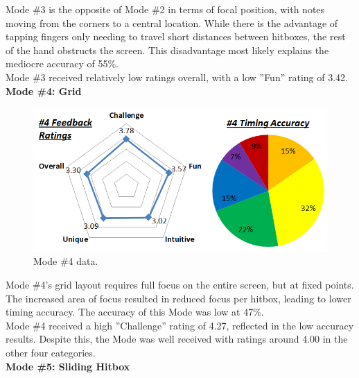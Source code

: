 \documentclass{sig-alternate}
\begin{document}
Mode \#3 is the opposite of Mode \#2 in terms of focal position, with notes moving from the corners to a central location. While there is the advantage of tapping fingers only needing to travel short distances between hitboxes, the rest of the hand obstructs the screen. This disadvantage most likely explains the mediocre accuracy of 55\%. \\

Mode \#3 received relatively low ratings overall, with a low ''Fun'' rating of 3.42. \\

\noindent \textbf{Mode \#4: Grid}

\begin{figure}[htb!]
	\begin{center}
		\includegraphics[width=1\linewidth]{figure_chart_4}
	\end{center}
	\vspace{-12pt}
	\caption{Mode \#4 data.}
	\label{fig:chart_4}
\end{figure}

Mode \#4's grid layout requires full focus on the entire screen, but at fixed points. The increased area of focus resulted in reduced focus per hitbox, leading to lower timing accuracy. The accuracy of this Mode was low at 47\%.\\

Mode \#4 received a high ''Challenge'' rating of 4.27, reflected in the low accuracy results. Despite this, the Mode was well received with ratings around 4.00 in the other four categories.\\

\newpage
\noindent \textbf{Mode \#5: Sliding Hitbox}
\end{document}
